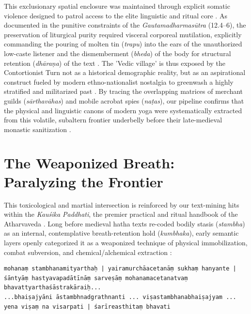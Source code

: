 \documentclass[11pt,twoside,letterpaper]{article}
\begin{document}
This exclusionary spatial enclosure was maintained through explicit somatic violence designed to patrol access to the elite linguistic and ritual core \cite{McCartney2026b}. As documented in the punitive constraints of the \textit{Gautamadharmasūtra} (12.4--6), the preservation of liturgical purity required visceral corporeal mutilation, explicitly commanding the pouring of molten tin (\textit{trapu}) into the ears of the unauthorized low-caste listener and the dismemberment (\textit{bheda}) of the body for structural retention (\textit{dhāraṇa}) of the text \cite{McCartney2026b}. The 'Vedic village' is thus exposed by the Contortionist Turn not as a historical demographic reality, but as an aspirational construct fueled by modern ethno-nationalist nostalgia to greenwash a highly stratified and militarized past \cite{McCartney2026b}. By tracing the overlapping matrices of merchant guilds (\textit{sārthavāhas}) and mobile acrobat spies (\textit{naṭas}), our pipeline confirms that the physical and linguistic canons of modern yoga were systematically extracted from this volatile, subaltern frontier underbelly before their late-medieval monastic sanitization \cite{McCartney2026b}.

\section{The Weaponized Breath: Paralyzing the Frontier}

This toxicological and martial intersection is reinforced by our text-mining hits within the \textit{Kauśika Paddhati}, the premier practical and ritual handbook of the Atharvaveda \cite{KauśP}. Long before medieval hatha texts re-coded bodily stasis (\textit{stambha}) as an internal, contemplative breath-retention hold (\textit{kumbhaka}), early semantic layers openly categorized it as a weaponized technique of physical immobilization, combat subversion, and chemical/alchemical extraction \cite{Birch2024, KauśP}:
\begin{lstlisting}[caption={Kauśika Paddhati Overlap Configuration}, label={list:kaushika}]
mohanaṃ stambhanamityarthaḥ | yairamurchāacetanāṃ sukhaṃ hanyante | 
śāntyāṃ hastyavapadātīnāṃ sarveṣāṃ mohanamacetanatvaṃ bhavattyarthaśāstrakāraiḥ...
...bhaiṣajyāni āstambhnadgrathnanti ... viṣastambhanabhaiṣajyam ... 
yena viṣaṃ na visarpati | śarīreasthitaṃ bhavati
\end{lstlisting}
\end{document}
